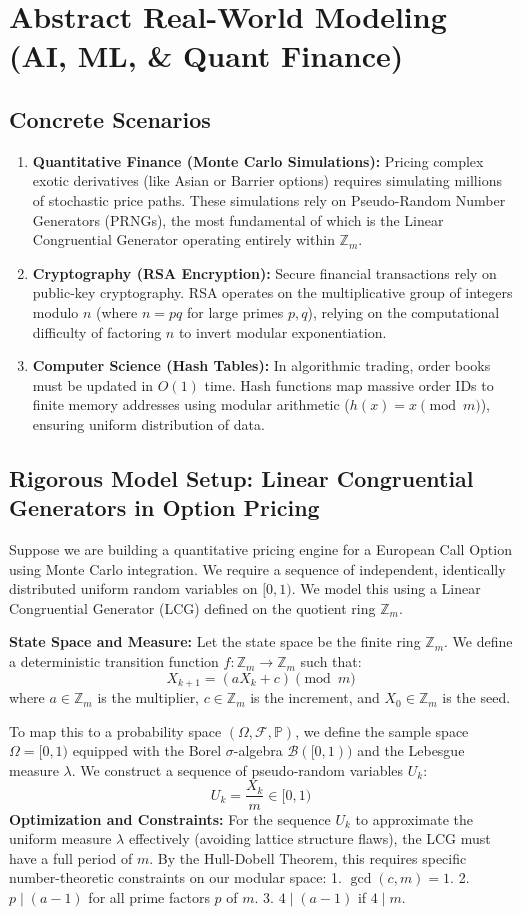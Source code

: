 \documentclass[11pt, a4paper]{article}
\theoremstyle{definition}
\theoremstyle{remark}
\newcommand{\Z}{\mathbb{Z}}
\newcommand{\Prob}{\mathbb{P}}
\newcommand{\F}{\mathcal{F}}
\begin{document}
\section{Abstract Real-World Modeling (AI, ML, \& Quant Finance)}

\subsection{Concrete Scenarios}
\begin{enumerate}
    \item \textbf{Quantitative Finance (Monte Carlo Simulations):} Pricing complex exotic derivatives (like Asian or Barrier options) requires simulating millions of stochastic price paths. These simulations rely on Pseudo-Random Number Generators (PRNGs), the most fundamental of which is the Linear Congruential Generator operating entirely within $\Z_m$.
    \item \textbf{Cryptography (RSA Encryption):} Secure financial transactions rely on public-key cryptography. RSA operates on the multiplicative group of integers modulo $n$ (where $n = pq$ for large primes $p, q$), relying on the computational difficulty of factoring $n$ to invert modular exponentiation.
    \item \textbf{Computer Science (Hash Tables):} In algorithmic trading, order books must be updated in $O(1)$ time. Hash functions map massive order IDs to finite memory addresses using modular arithmetic ($h(x) = x \pmod m$), ensuring uniform distribution of data.
\end{enumerate}

\subsection{Rigorous Model Setup: Linear Congruential Generators in Option Pricing}
Suppose we are building a quantitative pricing engine for a European Call Option using Monte Carlo integration. We require a sequence of independent, identically distributed uniform random variables on $[0, 1)$. We model this using a Linear Congruential Generator (LCG) defined on the quotient ring $\Z_m$.

\textbf{State Space and Measure:}
Let the state space be the finite ring $\Z_m$. We define a deterministic transition function $f: \Z_m \to \Z_m$ such that:
\[
X_{k+1} = (a X_k + c) \pmod m
\]
where $a \in \Z_m$ is the multiplier, $c \in \Z_m$ is the increment, and $X_0 \in \Z_m$ is the seed. 

To map this to a probability space $(\Omega, \F, \Prob)$, we define the sample space $\Omega = [0, 1)$ equipped with the Borel $\sigma$-algebra $\mathcal{B}([0,1))$ and the Lebesgue measure $\lambda$. We construct a sequence of pseudo-random variables $U_k$:
\[
U_k = \frac{X_k}{m} \in [0, 1)
\]
\textbf{Optimization and Constraints:}
For the sequence $U_k$ to approximate the uniform measure $\lambda$ effectively (avoiding lattice structure flaws), the LCG must have a full period of $m$. By the Hull-Dobell Theorem, this requires specific number-theoretic constraints on our modular space:
1. $\gcd(c, m) = 1$.
2. $p \mid (a - 1)$ for all prime factors $p$ of $m$.
3. $4 \mid (a - 1)$ if $4 \mid m$.
\end{document}
